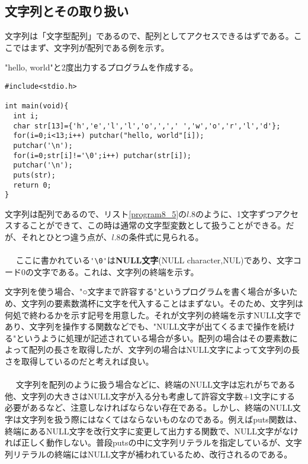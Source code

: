 \subsection{文字列とその取り扱い}
文字列は「文字型配列」であるので、配列としてアクセスできるはずである。ここではまず、文字列が配列である例を示す。
\begin{boxnote}
"hello, world"と2度出力するプログラムを作成する。
\begin{lstlisting}[caption=Hello World再び,label=program8_5]
#include<stdio.h>

int main(void){
  int i;
  char str[13]={'h','e','l','l','o',',',' ','w','o','r','l','d'};
  for(i=0;i<13;i++) putchar("hello, world"[i]);
  putchar('\n');
  for(i=0;str[i]!='\0';i++) putchar(str[i]);
  putchar('\n');
  puts(str);
  return 0;
}
\end{lstlisting}
\end{boxnote}

文字列は配列であるので、リスト\ref{program8_5}の$l$.8のように、1文字ずつアクセスすることができて、この時は通常の文字型変数として扱うことができる。だが、それとひとつ違う点が、$l$.8の条件式に見られる。
\\ \\　
ここに書かれている\verb|'\0'|は\textbf{NULL文字}(NULL character,NUL)であり、文字コード0の文字である。これは、文字列の終端を示す。

文字列を使う場合、"○文字まで許容する"というプログラムを書く場合が多いため、文字列の要素数満杯に文字を代入することはまずない。そのため、文字列は何処で終わるかを示す記号を用意した。それが文字列の終端を示すNULL文字であり、文字列を操作する関数などでも、"NULL文字が出てくるまで操作を続ける"というように処理が記述されている場合が多い。配列の場合はその要素数によって配列の長さを取得したが、文字列の場合はNULL文字によって文字列の長さを取得しているのだと考えれば良い。
\\ \\　
文字列を配列のように扱う場合などに、終端のNULL文字は忘れがちである他、文字列の大きさはNULL文字が入る分も考慮して許容文字数+1文字にする必要があるなど、注意しなければならない存在である。しかし、終端のNULL文字は文字列を扱う際にはなくてはならないものなのである。例えばputs関数は、終端にあるNULL文字を改行文字に変更して出力する関数で、NULL文字がなければ正しく動作しない。普段putsの中に文字列リテラルを指定しているが、文字列リテラルの終端にはNULL文字が補われているため、改行されるのである。


